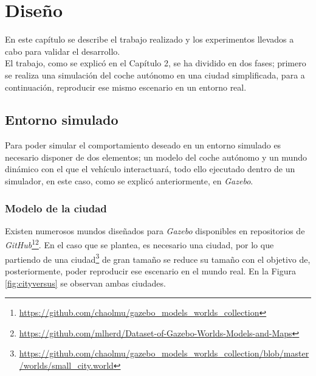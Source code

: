 \chapter{Diseño}
\label{cap:capitulo4}

En este capítulo se describe el trabajo realizado y los experimentos llevados a cabo para validar el desarrollo.\\

El trabajo, como se explicó en el Capítulo 2, se ha dividido en dos fases; primero se realiza una simulación del coche autónomo en una ciudad simplificada, para a continuación, reproducir ese mismo escenario en un entorno real.\\

\section{Entorno simulado}
\label{section:simulation}
Para poder simular el comportamiento deseado en un entorno simulado es necesario disponer de dos elementos; un modelo del coche autónomo y un mundo dinámico con el que el vehículo interactuará, todo ello ejecutado dentro de un simulador, en este caso, como se explicó anteriormente, en \textit{Gazebo}.\\

\subsection{Modelo de la ciudad}
\label{subsection:citymodel}
Existen numerosos mundos diseñados para \textit{Gazebo} disponibles en repositorios de \textit{GitHub}\footnote{\url{https://github.com/chaolmu/gazebo_models_worlds_collection}}\footnote{\url{https://github.com/mlherd/Dataset-of-Gazebo-Worlds-Models-and-Maps}}. En el caso que se plantea, es necesario una ciudad, por lo que partiendo de una ciudad\footnote{\url{https://github.com/chaolmu/gazebo_models_worlds_collection/blob/master/worlds/small_city.world}} de gran tamaño se reduce su tamaño con el objetivo de, posteriormente, poder reproducir ese escenario en el mundo real. En la Figura \ref{fig:cityversus} se observan ambas ciudades.\\

